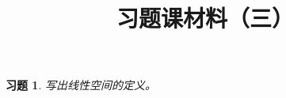 \documentclass[UTF8]{ctexart}
\newtheorem{ex}[thm]{习题}
\begin{document}
\title{习题课材料（三）}

\date{}

\maketitle

\vspace{-1cm}








	
\begin{ex}
写出线性空间的定义。
\end{ex}
\end{document}
